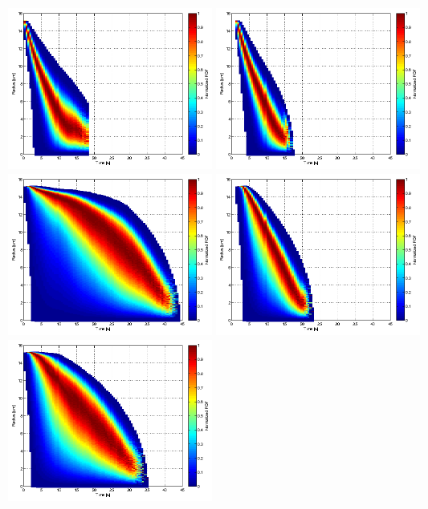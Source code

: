\begin{figure}[h]\centering
\includegraphics[width=0.48\textwidth]{Figures/pdf_radius_d1}
\includegraphics[width=0.48\textwidth]{Figures/pdf_radius_f1}\\
\includegraphics[width=0.48\textwidth]{Figures/pdf_radius_d2}
\includegraphics[width=0.48\textwidth]{Figures/pdf_radius_f2}\\
\includegraphics[width=0.48\textwidth]{Figures/pdf_radius_d3}

\end{figure}

